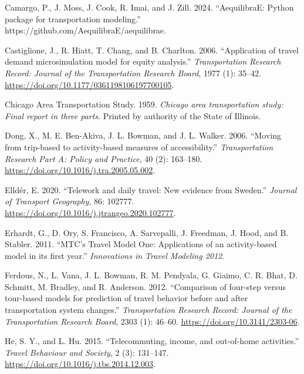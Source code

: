\documentclass[fancy, twoside, mastersfancy, ms]{byuthesis}
\newlength{\cslhangindent}
\newenvironment{CSLReferences}[2] %
 {\begin{list}{}{%
  \setlength{\itemindent}{0pt}
  \setlength{\leftmargin}{0pt}
  \setlength{\parsep}{0pt}
  \ifodd #1
   \setlength{\leftmargin}{\cslhangindent}
   \setlength{\itemindent}{-1\cslhangindent}
  \fi
  \setlength{\itemsep}{#2\baselineskip}}}
 {\end{list}}
\begin{document}
\begin{CSLReferences}{1}{0}
Camargo, P., J. Moss, J. Cook, R. Imai, and J. Zill. 2024.
{``{AequilibraE}: Python package for transportation modeling.''}
https://github.com/AequilibraE/aequilibrae.

Castiglione, J., R. Hiatt, T. Chang, and B. Charlton. 2006.
{``Application of travel demand microsimulation model for equity
analysis.''} \emph{Transportation Research Record: Journal of the
Transportation Research Board}, 1977 (1): 35--42.
\url{https://doi.org/10.1177/0361198106197700105}.

Chicago Area Transportation Study. 1959. \emph{Chicago area
transportation study: Final report in three parts}. Printed by authority
of the State of Illinois.

Dong, X., M. E. Ben-Akiva, J. L. Bowman, and J. L. Walker. 2006.
{``Moving from trip-based to activity-based measures of
accessibility.''} \emph{Transportation Research Part A: Policy and
Practice}, 40 (2): 163--180.
\url{https://doi.org/10.1016/j.tra.2005.05.002}.

Elldér, E. 2020. {``Telework and daily travel: New evidence from
{Sweden}.''} \emph{Journal of Transport Geography}, 86: 102777.
\url{https://doi.org/10.1016/j.jtrangeo.2020.102777}.

Erhardt, G., D. Ory, S. Francisco, A. Sarvepalli, J. Freedman, J. Hood,
and B. Stabler. 2011. {``{MTC}'s {Travel Model One}: Applications of an
activity-based model in its first year.''} \emph{Innovations in Travel
Modeling 2012}.

Ferdous, N., L. Vana, J. L. Bowman, R. M. Pendyala, G. Giaimo, C. R.
Bhat, D. Schmitt, M. Bradley, and R. Anderson. 2012. {``Comparison of
four-step versus tour-based models for prediction of travel behavior
before and after transportation system changes.''} \emph{Transportation
Research Record: Journal of the Transportation Research Board}, 2303
(1): 46--60. \url{https://doi.org/10.3141/2303-06}.

He, S. Y., and L. Hu. 2015. {``Telecommuting, income, and out-of-home
activities.''} \emph{Travel Behaviour and Society}, 2 (3): 131--147.
\url{https://doi.org/10.1016/j.tbs.2014.12.003}.


\end{CSLReferences}
\end{document}
